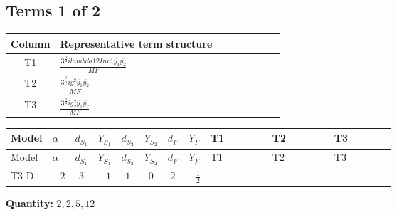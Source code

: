 \documentclass[8pt]{article}
\begin{document}
\begin{landscape}
\subsection*{Terms 1 of 2}
\begin{center}
\begin{tabular}{@{}c >{\raggedright\arraybackslash}p{0.82\linewidth}@{}}
\toprule
Column & Representative term structure \\
\midrule
T1 & \(\displaystyle \frac{3^{\frac{3}{4}} i lambda12Inv1 \overline{y_{1}} \overline{y_{2}}}{MF}\) \\
\midrule
T2 & \(\displaystyle \frac{3^{\frac{3}{4}} i g_{1}^{2} \overline{y_{1}} \overline{y_{2}}}{MF}\) \\
\midrule
T3 & \(\displaystyle \frac{3^{\frac{3}{4}} i g_{2}^{2} \overline{y_{1}} \overline{y_{2}}}{MF}\) \\
\midrule
\bottomrule
\end{tabular}
\end{center}
\smallskip
\tiny
\begin{longtable}{@{}llcccccc >{\raggedright\arraybackslash}p{0.21\linewidth} >{\raggedright\arraybackslash}p{0.21\linewidth} >{\raggedright\arraybackslash}p{0.21\linewidth}@{}}
\toprule
Model & $\alpha$ & $d_{S_1}$ & $Y_{S_1}$ & $d_{S_2}$ & $Y_{S_2}$ & $d_F$ & $Y_F$ & T1 & T2 & T3 \\
\midrule
\endfirsthead
\toprule
Model & $\alpha$ & $d_{S_1}$ & $Y_{S_1}$ & $d_{S_2}$ & $Y_{S_2}$ & $d_F$ & $Y_F$ & T1 & T2 & T3 \\
\midrule
\endhead
T3-D & $-2$ & $3$ & $-1$ & $1$ & $0$ & $2$ & $-\frac{1}{2}$ & \scriptsize\adjustbox{max width=\linewidth}{$\begin{gathered} \frac{3^{\frac{3}{4}} i lambda12Inv1 \overline{y_{1}} \overline{y_{2}}}{6 MF}\end{gathered}$} & \scriptsize\adjustbox{max width=\linewidth}{$\begin{gathered} \frac{3^{\frac{3}{4}} i g_{1}^{2} \overline{y_{1}} \overline{y_{2}}}{8 MF}\end{gathered}$} & \scriptsize\adjustbox{max width=\linewidth}{$\begin{gathered} \frac{11 \cdot 3^{\frac{3}{4}} i g_{2}^{2} \overline{y_{1}} \overline{y_{2}}}{8 MF}\end{gathered}$} \\
\midrule
\bottomrule
\end{longtable}
\clearpage
\noindent\textbf{Quantity: }$\mathrm{2,2,5,12}$\par\smallskip

\end{landscape}
\end{document}
